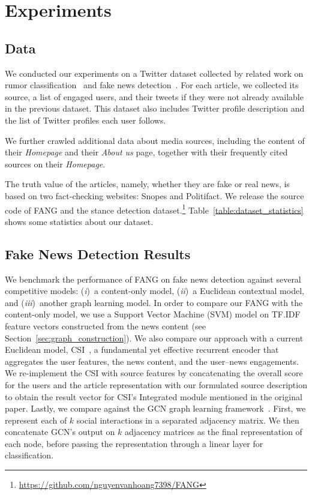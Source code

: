 \documentclass[sigconf]{acmart}
\theoremstyle{definition}
\theoremstyle{hypothesis}
\begin{document}
\section{Experiments}

\subsection{Data}

We conducted our experiments on a Twitter dataset collected by related work on rumor classification~\cite{ma2016detecting, Kochkina2018} and fake news detection~\cite{shu2018fakenewsnet}. For each article, we collected its source, a list of engaged users, and their tweets if they were not already available in the previous dataset.
This dataset also
includes Twitter profile description and the list of Twitter profiles each user follows. 

We further crawled additional data about media sources, including the content of their \emph{Homepage} and their \emph{About us} page, together with their frequently cited sources on their \emph{Homepage}. 

The truth value of the articles, namely, whether they are fake or real news, is based on two fact-checking websites: 
Snopes and Politifact. We release the source code of FANG and the stance detection 
dataset.\footnote{\scriptsize{\url{https://github.com/nguyenvanhoang7398/FANG}}} Table~\ref{table:dataset_statistics} shows some statistics about our dataset. 

\subsection{Fake News Detection Results}\label{sec:macroscopic}
We benchmark the performance of FANG on fake news detection against several competitive models: (\emph{i})~a content-only model, (\emph{ii})~a Euclidean contextual model, and (\emph{iii})~another graph learning model. 
In order to compare our FANG with the content-only model, 
we use a Support Vector Machine (SVM) model on TF.IDF feature vectors constructed from the news content (see Section~\ref{sec:graph_construction}). 
We also compare our approach with a current Euclidean model,  
CSI~\cite{ruchansky2017csi}, a fundamental yet effective recurrent encoder that aggregates the user features, the news content, and the user--news engagements. We re-implement the CSI with source features by concatenating the overall score for the users and the article representation with our formulated source description to obtain
the result vector for CSI's Integrated module 
mentioned in the original paper. 
Lastly, we compare against the GCN graph learning framework~\cite{kipf2016semi}. First, we represent each of $k$ social interactions in a separated adjacency matrix. We then concatenate GCN's output on $k$ adjacency matrices as the final representation of each node, before passing the representation through a linear layer for classification.
\end{document}

